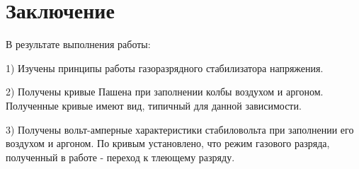 \documentclass[a4paper, 12pt]{article}
\begin{document}
\section*{\textbf{Заключение}}

В результате выполнения работы:

1) Изучены принципы работы газоразрядного стабилизатора напряжения.

2) Получены кривые Пашена при заполнении колбы воздухом и аргоном. Полученные кривые имеют вид, типичный для данной зависимости.

3) Получены вольт-амперные характеристики стабиловольта при заполнении его воздухом и аргоном. По кривым установлено, что режим газового разряда, полученный в работе - переход к тлеющему разряду.
\end{document}
